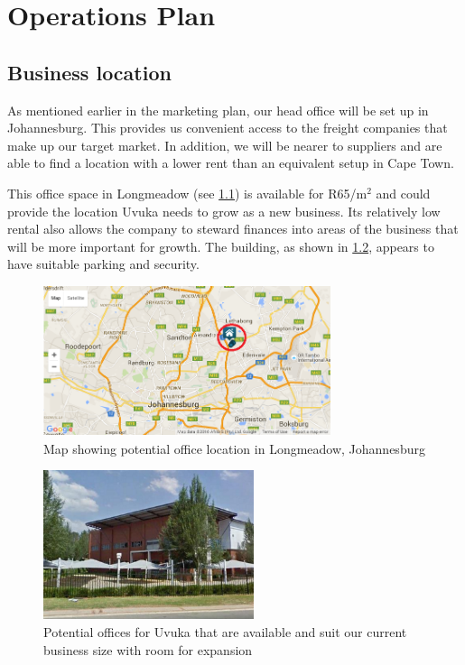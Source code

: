 \newpage

\chapter{Operations Plan}
\section{Business location}
As mentioned earlier in the marketing plan, our head office will be set up in Johannesburg. This provides us convenient access to the freight companies that make up our target market. In addition, we will be nearer to suppliers and are able to find a location with a lower rent than an equivalent setup in Cape Town.

This office space in Longmeadow (see \cref{fig:map}) is available for R65/m$^2$ and could provide the location Uvuka needs to grow as a new business. Its relatively low rental also allows the company to steward finances into areas of the business that will be more important for growth. The building, as shown in \cref{fig:offices}, appears to have suitable parking and security.

\begin{figure}[H]
\centering
\includegraphics[width=0.75\textwidth]{images/offices_map.PNG}
\vskip10pt
\caption[Map showing potential office location in Longmeadow, north of Johannesburg]{Map showing potential office location in Longmeadow, Johannesburg}
\label{fig:map}
\end{figure}

\begin{figure}[H]
\centering
\includegraphics[width=0.55\textwidth]{images/offices_building.PNG}
\vskip10pt
\caption[Potential offices for Uvuka]{Potential offices for Uvuka that are available and suit our current business size with room for expansion}
\label{fig:offices}
\end{figure}

